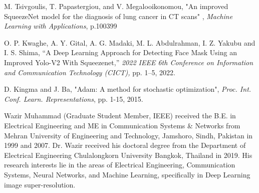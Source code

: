 \documentclass{ieeeaccess}
\begin{document}
\begin{thebibliography}{00}
 M. Tsivgoulis, T. Papastergiou, and V. Megalooikonomou, "An improved SqueezeNet model for the diagnosis of lung cancer in CT scans" , \textit{Machine Learning with Applications}, p.100399

 O. P. Kwaghe, A. Y. Gital, A. G. Madaki, M. L. Abdulrahman, I. Z. Yakubu and I. S. Shima, “A Deep Learning Approach for Detecting Face Mask Using an Improved Yolo-V2 With Squeezenet,” \textit{2022 IEEE 6th Conference on Information and Communication Technology (CICT),} pp. 1–5, 2022. 

 D. Kingma and J. Ba, "Adam: A method for stochastic optimization", \textit {Proc. Int. Conf. Learn. Representations}, pp. 1-15, 2015.

\end{thebibliography}

\begin{IEEEbiography}{Wazir Muhammad} (Graduate Student Member, IEEE) received the B.E. in Electrical
Engineering and ME in Communication Systems \& Networks from Mehran University of Engineering and Technology, Jamshoro, Sindh, Pakistan in 1999 and 2007. Dr. Wazir received his doctoral degree from the Department of Electrical Engineering Chulalongkorn University Bangkok, Thailand in 2019. His research interests lie in the areas of Electrical Engineering, Communication Systems, Neural Networks, and Machine Learning, specifically in Deep Learning image super-resolution.

\end{IEEEbiography}
\end{document}
